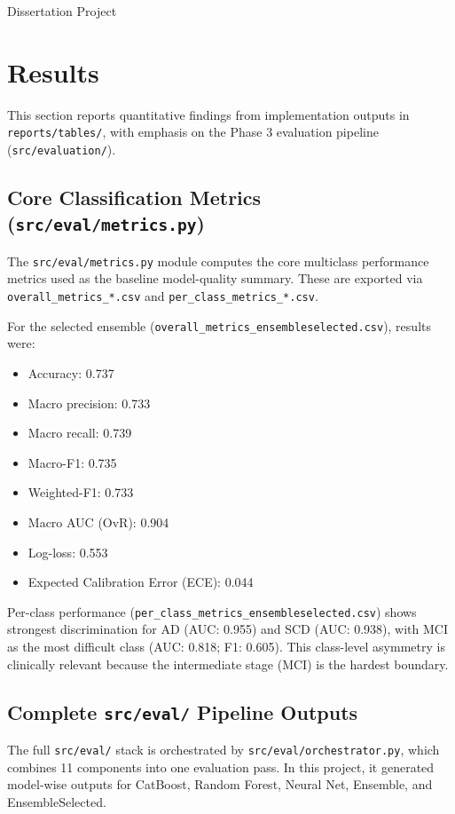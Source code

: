 ﻿\documentclass[12pt]{article}
\begin{document}
\thispagestyle{empty}
\begin{center}
    {\LARGE Dissertation Project}
\end{center}
\newpage

\section{Results}
This section reports quantitative findings from implementation outputs in \texttt{reports/tables/}, with emphasis on the Phase 3 evaluation pipeline (\texttt{src/evaluation/}).

\subsection{Core Classification Metrics (\texttt{src/eval/metrics.py})}
The \texttt{src/eval/metrics.py} module computes the core multiclass performance metrics used as the baseline model-quality summary. These are exported via \texttt{overall\_metrics\_*.csv} and \texttt{per\_class\_metrics\_*.csv}.

For the selected ensemble (\texttt{overall\_metrics\_ensembleselected.csv}), results were:
\begin{itemize}
    \item Accuracy: 0.737
    \item Macro precision: 0.733
    \item Macro recall: 0.739
    \item Macro-F1: 0.735
    \item Weighted-F1: 0.733
    \item Macro AUC (OvR): 0.904
    \item Log-loss: 0.553
    \item Expected Calibration Error (ECE): 0.044
\end{itemize}

Per-class performance (\texttt{per\_class\_metrics\_ensembleselected.csv}) shows strongest discrimination for AD (AUC: 0.955) and SCD (AUC: 0.938), with MCI as the most difficult class (AUC: 0.818; F1: 0.605). This class-level asymmetry is clinically relevant because the intermediate stage (MCI) is the hardest boundary.

\subsection{Complete \texttt{src/eval/} Pipeline Outputs}
The full \texttt{src/eval/} stack is orchestrated by \texttt{src/eval/orchestrator.py}, which combines 11 components into one evaluation pass. In this project, it generated model-wise outputs for CatBoost, Random Forest, Neural Net, Ensemble, and EnsembleSelected.
\end{document}
